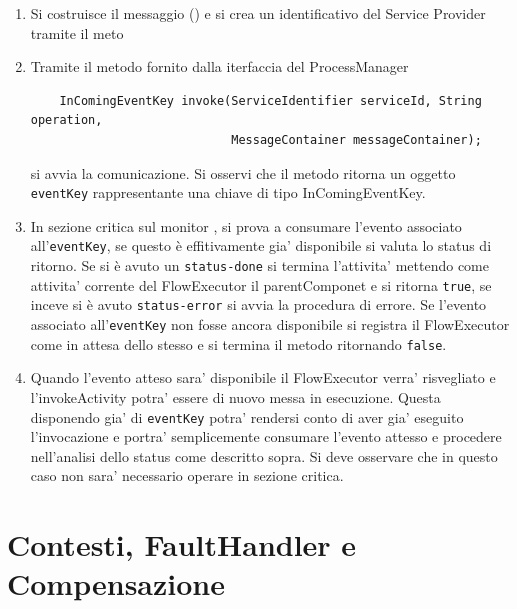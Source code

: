 \begin{enumerate}
  \item Si costruisce il messaggio () e si crea un
  identificativo del Service Provider tramite il meto
  \item Tramite il metodo fornito dalla iterfaccia del ProcessManager
  \begin{lstlisting}
  	InComingEventKey invoke(ServiceIdentifier serviceId, String operation, 
							MessageContainer messageContainer);
  \end{lstlisting}
  si avvia la comunicazione. Si osservi che il metodo ritorna un oggetto
  \texttt{eventKey} rappresentante una chiave di tipo InComingEventKey.
  
  \item In sezione critica sul monitor , si
  prova a consumare l'evento associato all'\texttt{eventKey}, se questo \`e
  effitivamente gia' disponibile si valuta lo status di ritorno. Se si \`e
  avuto un \texttt{status-done} si termina l'attivita' mettendo come
  attivita' corrente del FlowExecutor il parentComponet e si ritorna
  \texttt{true}, se inceve si \`e avuto \texttt{status-error} si avvia la
  procedura di errore. Se l'evento associato all'\texttt{eventKey} non fosse
  ancora disponibile si registra il FlowExecutor come in attesa dello stesso e
  si termina il metodo  ritornando \texttt{false}.
  
  \item Quando l'evento atteso sara' disponibile il FlowExecutor verra'
  risvegliato e l'invokeActivity potra' essere di nuovo messa in esecuzione.
  Questa disponendo gia' di \texttt{eventKey} potra' rendersi conto di aver
  gia' eseguito l'invocazione e portra' semplicemente consumare l'evento
  attesso e procedere nell'analisi dello status come descritto sopra. Si deve
  osservare che in questo caso non sara' necessario operare in sezione critica.
\end{enumerate}

\section{Contesti, FaultHandler e Compensazione}



